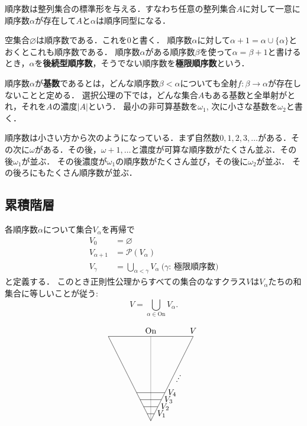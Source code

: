 \documentclass[uplatex,dvipdfmx]{jsarticle}
\newcommand{\PP}{\mathcal{P}}
\newcommand{\Ordinals}{\mathrm{On}}
\renewcommand\emptyset{\varnothing}
\theoremstyle{definition}
\begin{document}
順序数は整列集合の標準形を与える．すなわち任意の整列集合$A$に対して一意に順序数$\alpha$が存在して$A$と$\alpha$は順序同型になる．

空集合$\emptyset$は順序数である．これを$0$と書く．
順序数$\alpha$に対して$\alpha + 1 = \alpha \cup \{ \alpha \}$とおくとこれも順序数である．
順序数$\alpha$がある順序数$\beta$を使って$\alpha = \beta + 1$と書けるとき，$\alpha$を{\bfseries 後続型順序数}，そうでない順序数を{\bfseries 極限順序数}という．

順序数$\alpha$が{\bfseries 基数}であるとは，どんな順序数$\beta < \alpha$についても全射$f: \beta \to \alpha$が存在しないことと定める．
選択公理の下では，どんな集合$A$もある基数と全単射がとれ，それを$A$の濃度$|A|$という．
最小の非可算基数を$\omega_1$, 次に小さな基数を$\omega_2$と書く．

順序数は小さい方から次のようになっている．まず自然数$0, 1, 2, 3, \dots$がある．その次に$\omega$がある．その後，$\omega+1, \dots$と濃度が可算な順序数がたくさん並ぶ．その後$\omega_1$が並ぶ．
その後濃度が$\omega_1$の順序数がたくさん並び，その後に$\omega_2$が並ぶ．
その後ろにもたくさん順序数が並ぶ．

\subsection{累積階層}

各順序数$\alpha$について集合$V_\alpha$を再帰で
\begin{align*}
V_0 &= \emptyset \\
V_{\alpha+1} &= \PP(V_\alpha) \\
V_\gamma &= \bigcup_{\alpha < \gamma} V_\alpha\ \text{($\gamma$: 極限順序数)}
\end{align*}
と定義する．
このとき正則性公理からすべての集合のなすクラス$V$は$V_\alpha$たちの和集合に等しいことが従う:
\[
V = \bigcup_{\alpha \in \Ordinals} V_\alpha.
\]

\[
\begin{tikzpicture}[scale = 0.6]
\draw[gray] (0,0) -- (0,6);
\draw (-3,6) -- (0,0) -- (3,6) -- (-3,6);
\draw (-0.25,0.5) -- (0.25,0.5);
\draw (-0.5,1) -- (0.5,1);
\draw (-0.75,1.5) -- (0.75,1.5);
\draw (-1,2) -- (1,2);
\node[above] at (0,6) {$\Ordinals$};
\node[right] at (0.25,0.5) {$V_1$};
\node[right] at (0.5,1) {$V_2$};
\node[right] at (0.75,1.5) {$V_3$};
\node[right] at (1,2) {$V_4$};
\node[right,rotate=-30] at (1.8,3.3) {$\vdots$};
\node[above] at (3,6) {$V$};
\end{tikzpicture}
\]
\end{document}
